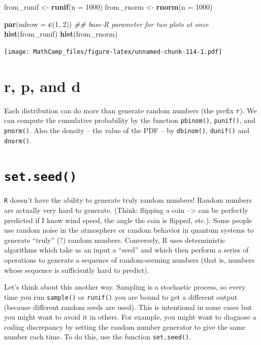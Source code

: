 \documentclass[
]{book}
\newenvironment{Shaded}{\begin{snugshade}}{\end{snugshade}}
\newcommand{\CommentTok}[1]{\textcolor[rgb]{0.56,0.35,0.01}{\textit{#1}}}
\newcommand{\DataTypeTok}[1]{\textcolor[rgb]{0.13,0.29,0.53}{#1}}
\newcommand{\DecValTok}[1]{\textcolor[rgb]{0.00,0.00,0.81}{#1}}
\newcommand{\KeywordTok}[1]{\textcolor[rgb]{0.13,0.29,0.53}{\textbf{#1}}}
\newcommand{\NormalTok}[1]{#1}
\newcommand{\StringTok}[1]{\textcolor[rgb]{0.31,0.60,0.02}{#1}}
\theoremstyle{definition}
\theoremstyle{definition}
\theoremstyle{definition}
\theoremstyle{definition}
\theoremstyle{remark}
\begin{document}
\begin{Shaded}
\begin{Highlighting}[]
\NormalTok{from_runif <-}\StringTok{ }\KeywordTok{runif}\NormalTok{(}\DataTypeTok{n =} \DecValTok{1000}\NormalTok{)}
\NormalTok{from_rnorm <-}\StringTok{ }\KeywordTok{rnorm}\NormalTok{(}\DataTypeTok{n =} \DecValTok{1000}\NormalTok{)}

\KeywordTok{par}\NormalTok{(}\DataTypeTok{mfrow =} \KeywordTok{c}\NormalTok{(}\DecValTok{1}\NormalTok{, }\DecValTok{2}\NormalTok{)) }\CommentTok{## base-R parameter for two plots at once}
\KeywordTok{hist}\NormalTok{(from_runif)}
\KeywordTok{hist}\NormalTok{(from_rnorm)}
\end{Highlighting}
\end{Shaded}

\texttt{[image: MathCamp\_files/figure-latex/unnamed-chunk-114-1.pdf]}

\hypertarget{r-p-and-d}{%
\section{r, p, and d}\label{r-p-and-d}}

Each distribution can do more than generate random numbers (the prefix \texttt{r}). We can compute the cumulative probability by the function \texttt{pbinom()}, \texttt{punif()}, and \texttt{pnorm()}. Also the density -- the value of the PDF -- by \texttt{dbinom()}, \texttt{dunif()} and \texttt{dnorm()}.

\hypertarget{set.seed}{%
\section{\texorpdfstring{\texttt{set.seed()}}{set.seed()}}\label{set.seed}}

\texttt{R} doesn't have the ability to generate truly random numbers! Random numbers are actually very hard to generate. (Think: flipping a coin --\textgreater{} can be perfectly predicted if I know wind speed, the angle the coin is flipped, etc.). Some people use random noise in the atmosphere or random behavior in quantum systems to generate ``truly'' (?) random numbers. Conversely, R uses deterministic algorithms which take as an input a ``seed'' and which then perform a series of operations to generate a sequence of random-seeming numbers (that is, numbers whose sequence is sufficiently hard to predict).

Let's think about this another way. Sampling is a stochastic process, so every time you run \texttt{sample()} or \texttt{runif()} you are bound to get a different output (because different random seeds are used). This is intentional in some cases but you might want to avoid it in others. For example, you might want to diagnose a coding discrepancy by setting the random number generator to give the same number each time. To do this, use the function \texttt{set.seed()}.
\end{document}
